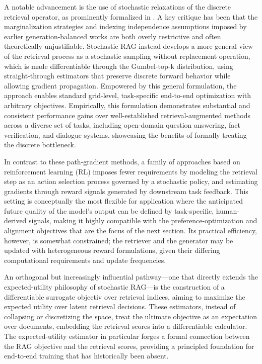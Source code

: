 \documentclass[11pt,a4paper]{article}
\begin{document}
A notable advancement is the use of stochastic relaxations of the discrete retrieval operator, as prominently formalized in \cite{arxiv:2405.02816v1}. A key critique has been that the marginalization strategies and indexing independence assumptions imposed by earlier generation-balanced works are both overly restrictive and often theoretically unjustifiable. Stochastic RAG instead develops a more general view of the retrieval process as a stochastic sampling without replacement operation, which is made differentiable through the Gumbel-top-k distribution, using straight-through estimators that preserve discrete forward behavior while allowing gradient propagation. Empowered by this general formulation, the approach enables standard grid-level, task-specific end-to-end optimization with arbitrary objectives. Empirically, this formulation demonstrates substantial and consistent performance gains over well-established retrieval-augmented methods across a diverse set of tasks, including open-domain question answering, fact verification, and dialogue systems, showcasing the benefits of formally treating the discrete bottleneck.

In contrast to these path-gradient methods, a family of approaches based on reinforcement learning (RL) imposes fewer requirements by modeling the retrieval step as an action selection process governed by a stochastic policy, and estimating gradients through reward signals generated by downstream task feedback. This setting is conceptually the most flexible for application where the anticipated future quality of the model's output can be defined by task-specific, human-derived signals, making it highly compatible with the preference-optimization and alignment objectives that are the focus of the next section. Its practical efficiency, however, is somewhat constrained; the retriever and the generator may be updated with heterogeneous reward formulations, given their differing computational requirements and update frequencies.

An orthogonal but increasingly influential pathway---one that directly extends the expected-utility philosophy of stochastic RAG---is the construction of a differentiable surrogate objectiv over retrieval indices, aiming to maximize the expected utility over latent retrieval decisions. These estimators, instead of collapsing or discretizing the space, treat the ultimate objective as an expectation over documents, embedding the retrieval scores into a differentiable calculator. The expected-utility estimator in particular forges a formal connection between the RAG objective and the retrieval scores, providing a principled foundation for end-to-end training that has historically been absent.
\end{document}
